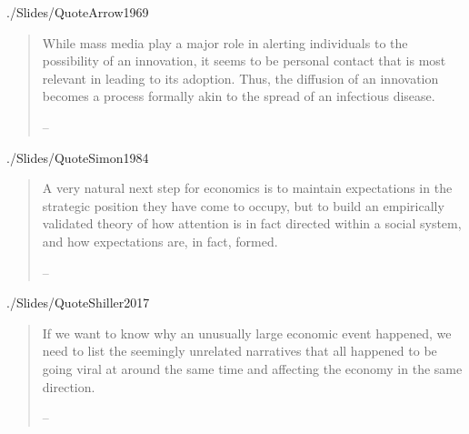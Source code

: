 \begin{frontmatter}
\begin{verbatimwrite}{./Slides/QuoteArrow1969}%
  \begin{quote}
    While mass media play a major role in alerting individuals to the
    possibility of an innovation, it seems to be personal contact that is
    most relevant in leading to its adoption. Thus, the diffusion of an
    innovation becomes a process formally akin to the spread of an
    infectious disease.

\medskip
        \indent -- \href{https://github.com/iworld1991/EpiExp/blob/master/Literature/arrow_classificatory_1969.pdf}{\cite{arrow_classificatory_1969}}
  \end{quote}
\end{verbatimwrite} %

\begin{verbatimwrite}{./Slides/QuoteSimon1984}%
\begin{quote}
	A very natural next step for economics is to maintain expectations in
	the strategic position they have come to occupy, but to build an
	empirically validated theory of how attention is in fact directed within
	a social system, and how expectations are, in fact, formed.

    \medskip
        \indent -- \href{https://econpapers.repec.org/RePEc:eee:jeborg:v:5:y:1984:i:1:p:35-55}{\cite{simon_behavioral_1984}}
\end{quote}
\end{verbatimwrite} %

\begin{verbatimwrite}{./Slides/QuoteShiller2017}%
  \begin{quote}
    If we want to know why an unusually large economic event happened, we
    need to list the seemingly unrelated narratives that all happened to be
    going viral at around the same time and affecting the economy in the
    same direction.

    \medskip
        \indent -- \href{https://www.amazon.in/Narrative-Economics-Stories-Economic-Events-ebook/dp/B07RRDVTHY}{\cite{shiller2017narrative}}
  \end{quote}
\end{verbatimwrite} %


\end{frontmatter}
